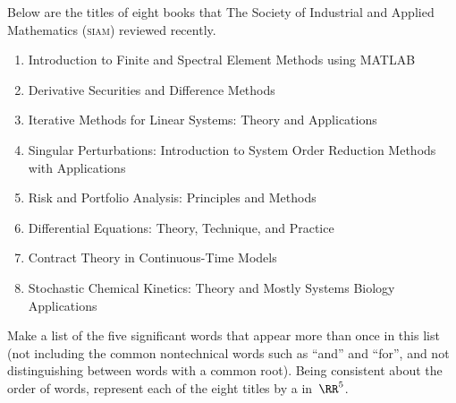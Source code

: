 \begin{exercise} \label{ex:8siambks} 
Below are the titles of eight books that The Society of Industrial and Applied Mathematics (\textsc{siam}) reviewed recently.
\begin{enumerate}
\item Introduction to Finite and Spectral Element Methods using MATLAB
\item Derivative Securities and Difference Methods 
\item Iterative Methods for Linear Systems: Theory and Applications 
\item Singular Perturbations: Introduction to System Order Reduction Methods with Applications 
\item Risk and Portfolio Analysis: Principles and Methods 
\item Differential Equations: Theory, Technique, and Practice 
\item Contract Theory in Continuous-Time Models 
\item Stochastic Chemical Kinetics: Theory and Mostly Systems Biology Applications
\end{enumerate}
Make a list of the five significant words that appear more than once in this list (not including the common nontechnical words such as ``and'' and ``for'', and not distinguishing between words with a common root).
Being consistent about the order of words, represent each of the eight titles by a  in~\(\RR^5\).

\end{exercise}






